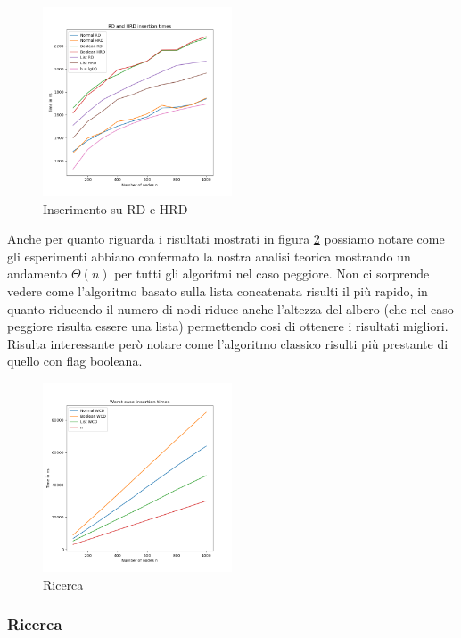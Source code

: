 \begin{figure}[H]
  \centering
  \includegraphics[width=0.5\textwidth]{Resources/ABR_Resources/RDeHRDinsertion.png}
  \caption{Inserimento su RD e HRD}
  \label{fig:RDHDins}
\end{figure}


Anche per quanto riguarda i risultati mostrati in figura \ref{fig:WCDins} possiamo notare come gli esperimenti abbiano confermato la nostra analisi teorica mostrando
un andamento $\Theta(n)$ per tutti gli algoritmi nel caso peggiore. Non ci sorprende vedere come l'algoritmo basato sulla lista concatenata risulti il più rapido, in quanto
riducendo il numero di nodi riduce anche l'altezza del albero (che nel caso peggiore risulta essere una lista) permettendo cosi di ottenere i risultati migliori.
Risulta interessante però notare come l'algoritmo classico risulti più prestante di quello con flag booleana.
\begin{figure}[H]
  \centering
  \includegraphics[width=0.5\textwidth]{Resources/ABR_Resources/WDinsertion.png}
  \caption{Ricerca}
  \label{fig:WCDins}
\end{figure}

\subsubsection{Ricerca}

